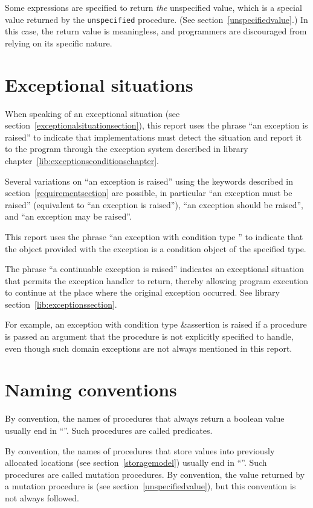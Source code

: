 Some expressions are specified to return \emph{the} unspecified value,
which is a special value returned by the \texttt{unspecified}
procedure.  (See section~\ref{unspecifiedvalue}.)  In this case, the
return value is meaningless, and programmers are discouraged from
relying on its specific nature.

\section{Exceptional situations}

When speaking of an exceptional situation (see section~\ref{exceptionalsituationsection}), this
report uses the phrase ``an exception is raised'' to indicate
that implementations must detect the situation and report it to the
program through the exception system described in
library chapter~\ref{lib:exceptionsconditionschapter}.

Several variations on ``an exception is raised'' using the keywords
described in section~\ref{requirementsection} are possible, in
particular ``an exception must be raised'' (equivalent to ``an
exception is raised''), ``an exception should be raised'', and ``an
exception may be raised''.

This report uses the phrase ``an exception with condition type ''
to indicate that the object provided with the
exception is a condition object of the specified type.

The phrase ``a continuable exception is raised'' indicates
an exceptional situation that permits the exception handler to return,
thereby allowing program execution to continue at the place where the
original exception occurred.  See library section~\ref{lib:exceptionssection}.

For example, an exception with condition type {\cf\&assertion}
is raised if a procedure is passed an argument that the procedure
is not explicitly specified to handle, even though such domain
exceptions are not always mentioned in this report.

\section{Naming conventions}

By convention, the names of procedures that always return a boolean
value usually end
in ``''.  Such procedures are called predicates.

By convention, the names of procedures that store values into previously
allocated locations (see section~\ref{storagemodel}) usually end in
``\ide{!}''.
Such procedures are called mutation procedures.
By convention, the value returned by a mutation procedure is
\unspecifiedreturn{} (see section~\ref{unspecifiedvalue}),
but this convention is not always followed.

